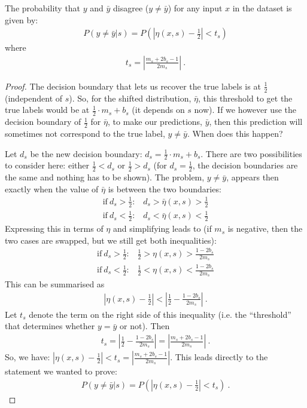 \begin{theorem}\label{th:tsybakov}
  The probability that $y$ and $\bar{y}$ disagree ($y\neq\bar{y}$) for any input $x$ in the dataset is given by:
  \begin{align}
    P(y\neq\bar{y}|s)=P\left(\left|\eta(x,s) - \tfrac{1}{2}\right| < t_s\right)
  \end{align}
  where
  \begin{align}
    t_s = \left|\frac{m_s+2b_s-1}{2m_s}\right|~.\label{eq:def-ts2}
  \end{align}
\end{theorem}
\begin{proof}
  The decision boundary that lets us recover the true labels is at $\tfrac{1}{2}$ (independent of $s$).
  So, for the shifted distribution, $\bar{\eta}$, this threshold to get the true labels would be at $\tfrac{1}{2}\cdot m_s + b_s$ (it depends on $s$ now).
  If we however use the decision boundary of $\tfrac{1}{2}$ for $\bar{\eta}$, to make our predictions, $\bar{y}$, then this prediction will sometimes not correspond to the true label, $y\neq\bar{y}$. When does this happen?

  Let $d_s$ be the new decision boundary: $d_s=\tfrac{1}{2}\cdot m_s + b_s$. There are two possibilities to consider here:
  either $\tfrac{1}{2}<d_s$ or $\tfrac{1}{2}>d_s$ (for $d_s=\tfrac{1}{2}$, the decision boundaries are the same and nothing has to be shown).
  The problem, $y\neq\bar{y}$, appears then exactly when the value of $\bar{\eta}$ is between the two boundaries:
  \begin{align}
    \text{if}~d_s>\tfrac{1}{2}\text{:}\quad d_s>\bar{\eta}(x, s)>\tfrac{1}{2} \\
    \text{if}~d_s<\tfrac{1}{2}\text{:}\quad d_s<\bar{\eta}(x, s)<\tfrac{1}{2}
  \end{align}
  Expressing this in terms of $\eta$ and simplifying leads to
  (if $m_s$ is negative, then the two cases are swapped, but we still get both inequalities):
  \begin{align}
    \text{if}~d_s>\tfrac{1}{2}\text{:}\quad\frac{1}{2}>\eta(x,s)>\frac{1-2b_s}{2m_s} \\
    \text{if}~d_s<\tfrac{1}{2}\text{:}\quad\frac{1}{2}<\eta(x,s)<\frac{1-2b_s}{2m_s}
  \end{align}
  This can be summarised as
  \begin{align}
    \left|\eta(x,s)-\frac{1}{2}\right|<\left|\frac{1}{2}-\frac{1-2b_s}{2m_s}\right|~.
  \end{align}
  Let $t_s$ denote the term on the right side of this inequality (i.e. the ``threshold'' that determines whether $y=\bar{y}$ or not). Then
  \begin{align}
    t_s=\left|\frac{1}{2} -\frac{1-2b_s}{2m_s}\right|=\left|\frac{m_s+2b_s-1}{2m_s}\right|~.
  \end{align}
  So, we have: $\left|\eta(x, s) - \frac{1}{2}\right| < t_s =\left|\tfrac{m_s+2b_s-1}{2m_s}\right|$.
  This leads directly to the statement we wanted to prove:
  \begin{align}
    P(y\neq\bar{y}|s)=P\left(\left|\eta(x, s)-\frac{1}{2}\right| <t_s\right)~.
  \end{align}
\end{proof}

